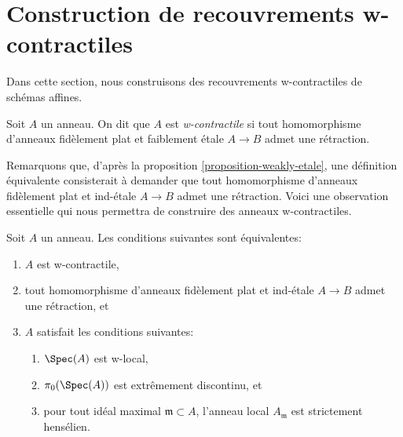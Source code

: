 \section{Construction de recouvrements w-contractiles}
\label{section-w-contractible}

\noindent
Dans cette section, nous construisons des recouvrements w-contractiles de schémas affines.

\begin{definition}
\label{definition-w-contractible}
Soit $A$ un anneau. On dit que $A$ est {\it w-contractile} si tout
homomorphisme d'anneaux fidèlement plat et faiblement \'etale $A \to B$ admet une rétraction.
\end{definition}

\noindent
Remarquons que, d'après la proposition \ref{proposition-weakly-etale},
une définition équivalente consisterait à demander que tout homomorphisme d'anneaux
fidèlement plat et ind-\'etale $A \to B$ admet une rétraction.
Voici une observation essentielle qui nous permettra de construire
des anneaux w-contractiles.

\begin{lemma}
\label{lemma-w-local-strictly-henselian-extremally-disconnected}
Soit $A$ un anneau. Les conditions suivantes sont équivalentes:
\begin{enumerate}
\item $A$ est w-contractile,
\item tout homomorphisme d'anneaux fidèlement plat et ind-\'etale $A \to B$ admet
une rétraction, et
\item $A$ satisfait les conditions suivantes:
\begin{enumerate}
\item $\Spec(A)$ est w-local,
\item $\pi_0(\Spec(A))$ est extrêmement discontinu, et
\item pour tout idéal maximal $\mathfrak m \subset A$, l'anneau
local $A_\mathfrak m$ est strictement hensélien.
\end{enumerate}
\end{enumerate}
\end{lemma}

